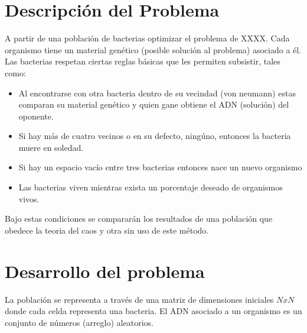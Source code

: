 \documentclass[DIV=calc, paper=a4, fontsize=11pt, twocolumn]{scrartcl}	 %
\begin{document}
\section*{Descripción del Problema}
A partir de una población de bacterias optimizar el problema de XXXX. Cada organismo tiene un material genético (posible solución al problema) asociado a él. Las bacterias respetan ciertas reglas básicas que les permiten subsistir, tales como:
\begin{itemize}
\item Al encontrarse con otra bacteria dentro de su vecindad (von neumann) estas comparan su material genético y quien gane obtiene el ADN (solución) del oponente.
\item Si hay más de cuatro vecinos o en su defecto, ningúno, entonces la  bacteria muere en soledad.
\item Si hay un espacio vacío entre tres bacterias entonces nace un nuevo organismo
\item Las bacterias viven mientras exista un porcentaje deseado de organismos vivos.
\end{itemize}
Bajo estas condiciones se compararán los resultados de una población que obedece la teoria del caos y otra sin uso de este método.
\section*{Desarrollo del problema}
La población se representa a través de una matriz de dimensiones iniciales $NxN$ donde cada celda representa una bacteria. El ADN asociado a un organismo es un conjunto de números (arreglo) aleatorios.

\end{document}
